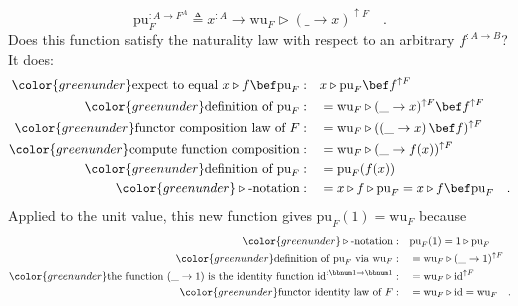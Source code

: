 \noindent \vspace{-1\baselineskip}
\begin{equation}
\text{pu}_{F}^{:A\rightarrow F^{A}}\triangleq x^{:A}\rightarrow\text{wu}_{F}\triangleright(\_\rightarrow x)^{\uparrow F}\quad.\label{eq:pu-via-wu-def}
\end{equation}
Does this function satisfy the naturality law with respect to an arbitrary
$f^{:A\rightarrow B}$? It does:
\begin{align*}
{\color{greenunder}\text{expect to equal }x\triangleright f\bef\text{pu}_{F}:}\quad & x\triangleright\text{pu}_{F}\bef f^{\uparrow F}\\
{\color{greenunder}\text{definition of }\text{pu}_{F}:}\quad & =\text{wu}_{F}\triangleright(\_\rightarrow x)^{\uparrow F}\bef f^{\uparrow F}\\
{\color{greenunder}\text{functor composition law of }F:}\quad & =\text{wu}_{F}\triangleright(\left(\_\rightarrow x\right)\bef f)^{\uparrow F}\\
{\color{greenunder}\text{compute function composition}:}\quad & =\text{wu}_{F}\triangleright(\_\rightarrow f(x))^{\uparrow F}\\
{\color{greenunder}\text{definition of }\text{pu}_{F}:}\quad & =\text{pu}_{F}(f(x))\\
{\color{greenunder}\triangleright\text{-notation}:}\quad & =x\triangleright f\triangleright\text{pu}_{F}=x\triangleright f\bef\text{pu}_{F}\quad.
\end{align*}
Applied to the unit value, this new function gives $\text{pu}_{F}(1)=\text{wu}_{F}$
because
\begin{align*}
{\color{greenunder}\triangleright\text{-notation}:}\quad & \text{pu}_{F}(1)=1\triangleright\text{pu}_{F}\\
{\color{greenunder}\text{definition of }\text{pu}_{F}\text{ via }\text{wu}_{F}:}\quad & =\text{wu}_{F}\triangleright(\_\rightarrow1)^{\uparrow F}\\
{\color{greenunder}\text{the function }(\_\rightarrow1)\text{ is the identity function }\text{id}^{:\bbnum 1\rightarrow\bbnum 1}:}\quad & =\text{wu}_{F}\triangleright\text{id}^{\uparrow F}\\
{\color{greenunder}\text{functor identity law of }F:}\quad & =\text{wu}_{F}\triangleright\text{id}=\text{wu}_{F}\quad.
\end{align*}

